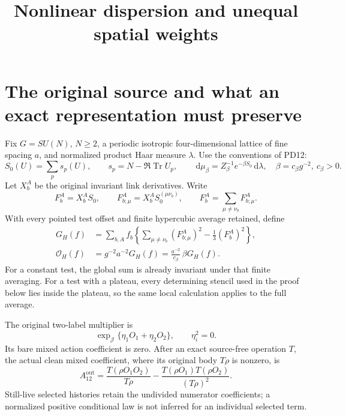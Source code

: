 \documentclass[11pt,letterpaper]{article}
\title{Nonlinear dispersion and unequal spatial weights}\author{}\date{}
\numberwithin{equation}{section}
\theoremstyle{plain}
\theoremstyle{remark}
\DeclareMathOperator{\Tr}{Tr}
\newcommand{\dd}{\,\mathrm d}
\newcommand{\OH}{\mathcal O_H}
\begin{document}
\maketitle
\section{The original source and what an exact representation must preserve}

Fix $G=SU(N)$, $N\ge2$, a periodic isotropic four-dimensional lattice of fine spacing
$a$, and normalized product Haar measure $\lambda$. Use the conventions of PD12:
\begin{equation}
 S_0(U)=\sum_p s_p(U),\qquad s_p=N-\Re\Tr U_p,\qquad
 \dd\mu_\beta=Z_\beta^{-1}e^{-\beta S_0}\dd\lambda,
 \quad \beta=c_\beta g^{-2},\ c_\beta>0.
 \label{eq:wilson}
\end{equation}
Let $X_b^A$ be the original invariant link derivatives. Write
\[
 F_b^A=X_b^AS_0,\qquad F_{b;\mu}^A=X_b^AS_0^{(\mu\nu_b)},
 \qquad F_b^A=\sum_{\mu\ne\nu_b}F_{b;\mu}^A.
\]
With every pointed test offset and finite hypercubic average retained, define
\begin{align}
 G_H(f)&=\sum_{b,A}f_b\left\{\sum_{\mu\ne\nu_b}(F_{b;\mu}^A)^2
                       -\frac13(F_b^A)^2\right\},\label{eq:GH}\\
 \OH(f)&=g^{-2}a^{-2}G_H(f)=\frac{a^{-2}}{c_\beta}\,\beta G_H(f).
 \label{eq:normalization}
\end{align}
For a constant test, the global sum is already invariant under that finite averaging.
For a test with a plateau, every determining stencil used in the proof below lies
inside the plateau, so the same local calculation applies to the full average.

The original two-label multiplier is
\begin{equation}
 \exp_{\mathcal J}\{\eta_1O_1+\eta_2O_2\},\qquad \eta_i^2=0.
 \label{eq:source}
\end{equation}
Its bare mixed action coefficient is zero. After an exact source-free operation $T$,
the actual clean mixed coefficient, where its original body $T\rho$ is nonzero, is
\begin{equation}
 A_{12}^{\mathrm{out}}
 =\frac{T(\rho O_1O_2)}{T\rho}
  -\frac{T(\rho O_1)T(\rho O_2)}{(T\rho)^2}.
 \label{eq:sourceout}
\end{equation}
Still-live selected histories retain the undivided numerator coefficients; a
normalized positive conditional law is not inferred for an individual selected term.
\end{document}
